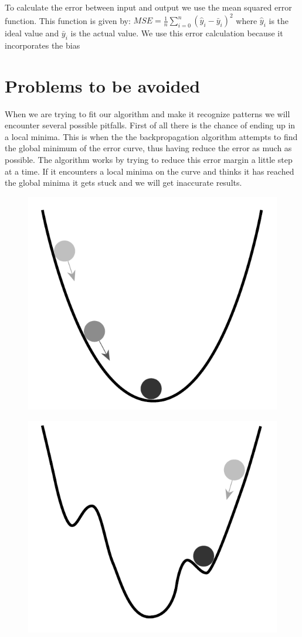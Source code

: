 To calculate the error between input and output we use the mean squared error function. This function is given by: \begin{math} MSE=\frac{1}{n}\sum_{i=0}^{n}(\hat{y}_i-\bar{y}_i)^2 \end{math} where \begin{math} \hat{y}_i \end{math} is the ideal value and \begin{math} \bar{y}_i \end{math} is the actual value. We use this error calculation because it incorporates the bias \cite{meanSquaredError}

\section{Problems to be avoided}
When we are trying to fit our algorithm and make it recognize patterns we will encounter several possible pitfalls. First of all there is the chance of ending up in a local minima. This is when the the backpropagation algorithm attempts to find the global minimum of the error curve, thus having reduce the error as much as possible. The algorithm works by trying to reduce this error margin a little step at a time. If it encounters a local minima on the curve and thinks it has reached the global minima it gets stuck and we will get inaccurate results. 

\begin{figure}
\centering
\begin{minipage}{.5\textwidth}
  \centering
  \includegraphics[width=.4\linewidth]{billeder/globalMinimum.png}
  \label{fig:test1}
\end{minipage}%
\begin{minipage}{.5\textwidth}
  \centering
  \includegraphics[width=.4\linewidth]{billeder/localMinimum.png}
  \label{fig:localMinimum}
\end{minipage}
\end{figure}

